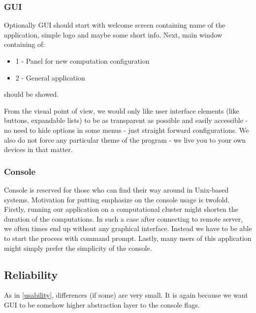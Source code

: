 \documentclass{article}
\begin{document}
\subsubsection{GUI}
Optionally GUI should start with welcome screen containing name of the application, simple logo and maybe some short info. Next, main window containing of:
\begin{itemize} 
\item 1 - Panel for new computation configuration
\item 2 - General application 
\end{itemize} 
should be showed. 

From the visual point of view, we would only like user interface elements (like buttons, expandable lists) to be as transparent as possible and easily accessible - no need to hide options in some menus - just straight forward configurations. We also do not force any particular theme of the program - we live you to your own devices in that matter.


\subsubsection{Console}
Console is reserved for those who can find their way around in Unix-based systems. Motivation for putting emphasize on the console usage is twofold. Firstly, running our application on a computational cluster might shorten the duration of the computations. In such a case after connecting to remote server, we often times end up without any graphical interface. Instead we have to be able to start the process with command prompt. Lastly, many users of this application might simply prefer the simplicity of the console.


%
%
\subsection{Reliability}
As in \ref{usability}, differences (if some) are very small. It is again because we want GUI to be somehow higher abstraction layer to the console flags.

\end{document}
